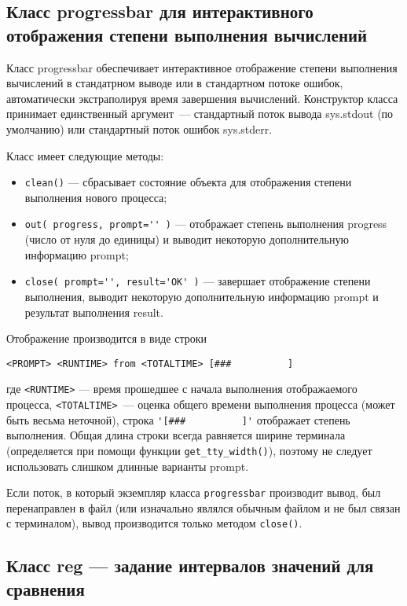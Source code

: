 \subsection{Класс {\sf progressbar} для интерактивного отображения степени
  выполнения вычислений}
Класс {\sf progressbar} обеспечивает интерактивное отображение степени
выполнения вычислений в стандатрном выводе или в стандартном потоке ошибок,
автоматически экстраполируя время завершения вычислений. Конструктор класса
принимает единственный аргумент~--- стандартный поток вывода {\sf sys.stdout} (по умолчанию)
или стандартный поток ошибок {\sf sys.stderr}. 

Класс имеет следующие методы:
\begin{itemize}
\item \verb'clean()' --- сбрасывает состояние объекта для отображения степени
  выполнения нового процесса;
\item \verb|out( progress, prompt='' )| --- отображает степень выполнения {\sf
progress} (число от нуля до единицы) и выводит некоторую дополнительную
  информацию {\sf prompt};
\item \verb|close( prompt='', result='OK' )| --- завершает отображение степени
  выполнения,  выводит  некоторую дополнительную
  информацию {\sf prompt} и результат выполнения {\sf result}. 
\end{itemize}

Отображение производится в виде строки 
\begin{verbatim}
<PROMPT> <RUNTIME> from <TOTALTIME> [###          ]
\end{verbatim}
где \verb'<RUNTIME>' --- время прошедшее с начала выполнения отображаемого
процесса, \verb'<TOTALTIME>'~--- оценка общего времени выполнения процесса
(может быть весьма неточной), строка \verb|'[###          ]'| отображает степень
выполнения. Общая длина строки всегда равняется ширине терминала (определяется
при помощи функции \verb'get_tty_width()'), поэтому не следует использовать слишком
длинные варианты {\sf prompt}.

Если поток, в который экземпляр класса {\tt progressbar} производит вывод, был перенаправлен в файл 
(или изначально являлся обычным файлом и не был связан с терминалом), вывод производится только методом {\tt close()}.

\subsection{Класс {\sf reg} --- задание интервалов значений для сравнения}

